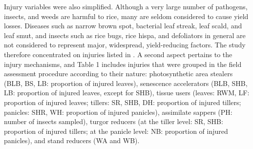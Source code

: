Injury variables were also simplified. Although a very large number of pathogens, insects, and weeds are harmful to rice, many are seldom considered to cause yield losses. Diseases such as narrow brown spot, bacterial leaf streak, leaf scald, and leaf smut, and insects such as rice bugs, rice hispa, and defoliators in general are not considered to represent major, widespread, yield-reducing factors. The study therefore concentrated on injuries listed in . A second aspect pertains to the injury mechanisms, and Table 1 includes injuries that were grouped in the field assessment procedure according to their nature: photosynthetic area stealers (BLB, BS, LB: proportion of injured leaves), senescence accelerators (BLB, SHB, LB: proportion of injured leaves, except for SHB), tissue users (leaves: RWM, LF: proportion of injured leaves; tillers: SR, SHB, DH: proportion of injured tillers; panicles: SHR, WH: proportion of injured panicles), assimilate sappers (PH: number of insects sampled), turgor reducers (at the tiller level: SR, SHB: proportion of injured tillers; at the panicle level: NB: proportion of injured panicles), and stand reducers (WA and WB).
